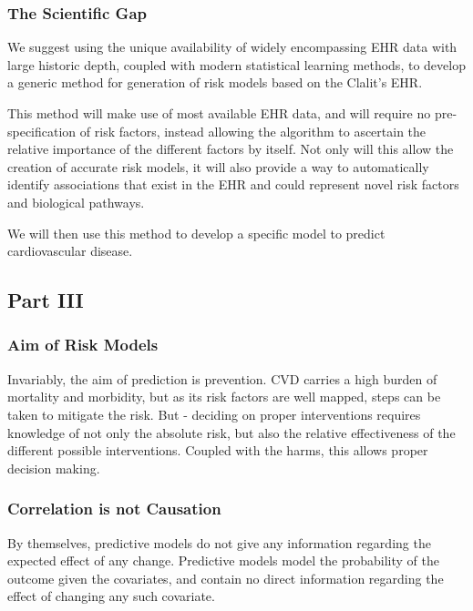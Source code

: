 \documentclass[a4paper,12pt]{article}
\begin{document}
			\subsubsection{The Scientific Gap}
			
			We suggest using the unique availability of widely encompassing EHR data with large historic depth, coupled with modern statistical learning methods, to develop a generic method for generation of risk models based on the Clalit's EHR.
			
			This method will make use of most available EHR data, and will require no pre-specification of risk factors, instead allowing the algorithm to ascertain the relative importance of the different factors by itself. Not only will this allow the creation of accurate risk models, it will also provide a way to automatically identify associations that exist in the EHR and could represent novel risk factors and biological pathways.
			
			We will then use this method to develop a specific model to predict cardiovascular disease.
		
		\subsection{Part III}
		
			\subsubsection{Aim of Risk Models}
			
			Invariably, the aim of prediction is prevention. CVD carries a high burden of mortality and morbidity, but as its risk factors are well mapped\cite{Yusuf2004}, steps can be taken to mitigate the risk. But - deciding on proper interventions requires knowledge of not only the absolute risk, but also the relative effectiveness of the different possible interventions. Coupled with the harms, this allows proper decision making.
			
			\subsubsection{Correlation is not Causation}
			
			By themselves, predictive models do not give any information regarding the expected effect of any change. Predictive models model the probability of the outcome given the covariates, and contain no direct information regarding the effect of changing any such covariate.
			
\end{document}
